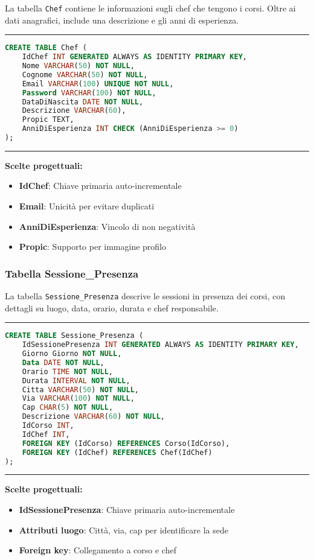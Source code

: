 La tabella \texttt{Chef} contiene le informazioni sugli chef che tengono i corsi. Oltre ai dati anagrafici, include una descrizione e gli anni di esperienza.

\noindent\rule{\textwidth}{0.4pt}
\begin{lstlisting}[language=SQL, style=sqlstyle]
CREATE TABLE Chef (
    IdChef INT GENERATED ALWAYS AS IDENTITY PRIMARY KEY,
    Nome VARCHAR(50) NOT NULL,
    Cognome VARCHAR(50) NOT NULL,
    Email VARCHAR(100) UNIQUE NOT NULL,
    Password VARCHAR(100) NOT NULL,
    DataDiNascita DATE NOT NULL,
    Descrizione VARCHAR(60),
    Propic TEXT,
    AnniDiEsperienza INT CHECK (AnniDiEsperienza >= 0)
);
\end{lstlisting}
\noindent\rule{\textwidth}{0.4pt}

\textbf{Scelte progettuali:}
\begin{itemize}
    \item \textbf{IdChef}: Chiave primaria auto-incrementale
    \item \textbf{Email}: Unicità per evitare duplicati
    \item \textbf{AnniDiEsperienza}: Vincolo di non negatività
    \item \textbf{Propic}: Supporto per immagine profilo
\end{itemize}

\subsubsection{Tabella Sessione\_Presenza}

La tabella \texttt{Sessione\_Presenza} descrive le sessioni in presenza dei corsi, con dettagli su luogo, data, orario, durata e chef responsabile.

\noindent\rule{\textwidth}{0.4pt}
\begin{lstlisting}[language=SQL, style=sqlstyle]
CREATE TABLE Sessione_Presenza (
    IdSessionePresenza INT GENERATED ALWAYS AS IDENTITY PRIMARY KEY,
    Giorno Giorno NOT NULL,
    Data DATE NOT NULL,
    Orario TIME NOT NULL,
    Durata INTERVAL NOT NULL,
    Citta VARCHAR(50) NOT NULL,
    Via VARCHAR(100) NOT NULL,
    Cap CHAR(5) NOT NULL,
    Descrizione VARCHAR(60) NOT NULL,
    IdCorso INT,
    IdChef INT,
    FOREIGN KEY (IdCorso) REFERENCES Corso(IdCorso),
    FOREIGN KEY (IdChef) REFERENCES Chef(IdChef)
);
\end{lstlisting}
\noindent\rule{\textwidth}{0.4pt}

\textbf{Scelte progettuali:}
\begin{itemize}
    \item \textbf{IdSessionePresenza}: Chiave primaria auto-incrementale
    \item \textbf{Attributi luogo}: Città, via, cap per identificare la sede
    \item \textbf{Foreign key}: Collegamento a corso e chef
\end{itemize}


